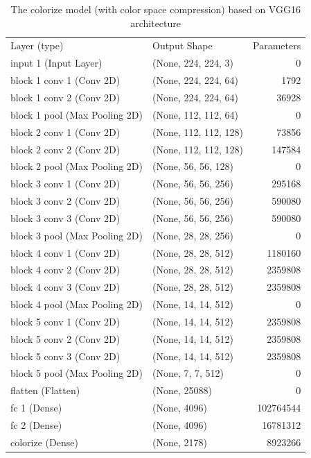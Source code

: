 \documentclass[12pt]{article}
\begin{document}
\begin{table}[H]
	\caption{The colorize model (with color space compression) based on VGG16 architecture}
  	\centering
	\begin{tabular}{|l|l|r|}
		\hline 
		Layer (type)                  &  Output Shape           &    Parameters  \\ \hhline{|=|=|=|}
		input 1 (Input Layer)         &  (None, 224, 224, 3)    &    0           \\ \hline
		block 1 conv 1 (Conv 2D)      &  (None, 224, 224, 64)   &    1792        \\ \hline 
		block 1 conv 2 (Conv 2D)      &  (None, 224, 224, 64)   &    36928       \\ \hline 
		block 1 pool (Max Pooling 2D) &  (None, 112, 112, 64)   &    0           \\ \hline 
		block 2 conv 1 (Conv 2D)      &  (None, 112, 112, 128)  &    73856    \\ \hline 
		block 2 conv 2 (Conv 2D)      &  (None, 112, 112, 128)  &    147584   \\ \hline 
		block 2 pool (Max Pooling 2D) &  (None, 56, 56, 128)    &    0        \\ \hline 
		block 3 conv 1 (Conv 2D)      &  (None, 56, 56, 256)    &    295168   \\ \hline 
		block 3 conv 2 (Conv 2D)      &  (None, 56, 56, 256)    &    590080   \\ \hline 
		block 3 conv 3 (Conv 2D)      &  (None, 56, 56, 256)    &    590080   \\ \hline 
		block 3 pool (Max Pooling 2D) &  (None, 28, 28, 256)    &    0        \\ \hline 
		block 4 conv 1 (Conv 2D)      &  (None, 28, 28, 512)    &    1180160  \\ \hline 
		block 4 conv 2 (Conv 2D)      &  (None, 28, 28, 512)    &    2359808  \\ \hline 
		block 4 conv 3 (Conv 2D)      &  (None, 28, 28, 512)    &    2359808  \\ \hline 
		block 4 pool (Max Pooling 2D) &  (None, 14, 14, 512)    &    0        \\ \hline 
		block 5 conv 1 (Conv 2D)      &  (None, 14, 14, 512)    &    2359808  \\ \hline 	
		block 5 conv 2 (Conv 2D)      &  (None, 14, 14, 512)    &    2359808  \\ \hline 
		block 5 conv 3 (Conv 2D)      &  (None, 14, 14, 512)    &    2359808  \\ \hline 
		block 5 pool (Max Pooling 2D) &  (None, 7, 7, 512)      &    0        \\ \hline 
		flatten (Flatten)             &  (None, 25088)          &    0        \\ \hline 
		fc 1 (Dense)                  &  (None, 4096)           &    102764544 \\ \hline 
		fc 2 (Dense)                  &  (None, 4096)           &    16781312  \\ \hline 
		colorize (Dense)              & (None, 2178)            &  8923266   
	\end{tabular}
\end{table}
\end{document}
